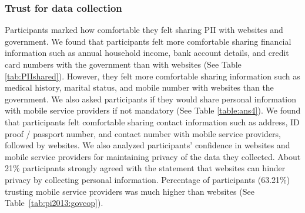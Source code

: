 \subsubsection{Trust for data collection}
Participants marked how comfortable they felt sharing PII with websites and government. We found that participants felt more comfortable sharing financial information such as annual household income, bank account details, and credit card numbers with the government than with websites (See Table \ref{tab:PIIshared}). However, they felt more comfortable sharing information such as medical history, marital status, and mobile number with websites than the government.
We also asked participants if they would share personal information with mobile service providers if not mandatory (See Table \ref{table:ans4}). We found that participants felt comfortable sharing contact information such as address, ID proof / passport number, and contact number with mobile service providers, followed by websites. We also analyzed participants' confidence in websites and mobile service providers for maintaining privacy of the data they collected. About 21\% participants strongly agreed with the statement that websites can hinder privacy by collecting personal information. Percentage of participants (63.21\%) trusting mobile service providers was much higher than websites (See Table~\ref{tab:pi2013:govcop}).
\vspace{-4mm}
